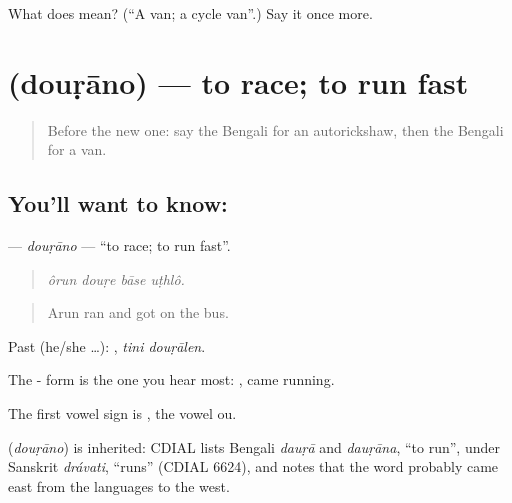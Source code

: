\begin{tcolorbox}[breakable,colback=teal!4,colframe=teal!35!black,title={Before you move on}]
What does  mean? (\textquotedblleft{}A van; a cycle van\textquotedblright{}.) Say it once more.
\end{tcolorbox}
\section[\texorpdfstring{\bn{দৌড়ানো} (douṛāno)}{দৌড়ানো (douṛāno)}]{ (douṛāno) — to race; to run fast}

\label{lesson:BN-C388-dourano}



\begin{quote}
Before the new one: say the Bengali for an autorickshaw, then the Bengali for a van.
\end{quote}

\subsection*{You'll want to know: }
\textbf{} — \emph{douṛāno} — \textquotedblleft{}to race; to run fast\textquotedblright{}.

\begin{quote}
   
\end{quote}

\begin{quote}
\emph{ôrun douṛe bāse uṭhlô.}
\end{quote}

\begin{quote}
Arun ran and got on the bus.
\end{quote}

Past (he/she …):  , \emph{tini douṛālen}.

The - form  is the one you hear most:  , came running.

The first vowel sign is , the vowel ou.

\begin{cousinweb}
\textbf{} (\emph{douṛāno}) is inherited: CDIAL lists Bengali \emph{dauṛā} and \emph{dauṛāna}, \textquotedblleft{}to run\textquotedblright{}, under Sanskrit \emph{drávati}, \textquotedblleft{}runs\textquotedblright{} (CDIAL 6624), and notes that the word probably came east from the languages to the west.
\end{cousinweb}

